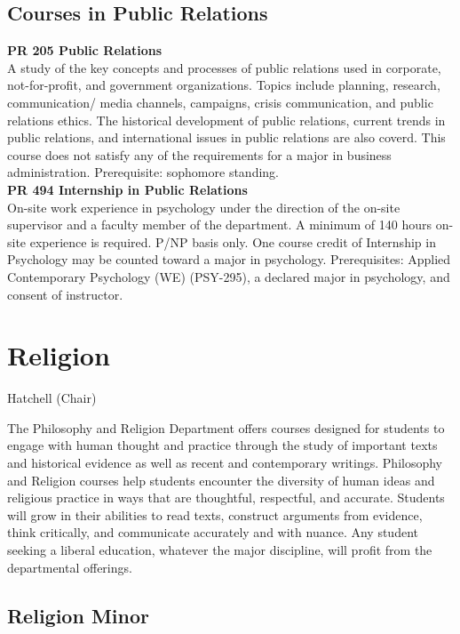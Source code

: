 \documentclass[
  letterpaper,
]{scrbook}
\begin{document}
\subsection{Courses in Public
Relations}\label{courses-in-public-relations}

\textbf{PR 205 Public Relations}\\
A study of the key concepts and processes of public relations used in
corporate, not-for-profit, and government organizations. Topics include
planning, research, communication/ media channels, campaigns, crisis
communication, and public relations ethics. The historical development
of public relations, current trends in public relations, and
international issues in public relations are also coverd. This course
does not satisfy any of the requirements for a major in business
administration. Prerequisite: sophomore standing.\\
\textbf{PR 494 Internship in Public Relations}\\
On-site work experience in psychology under the direction of the on-site
supervisor and a faculty member of the department. A minimum of 140
hours on-site experience is required. P/NP basis only. One course credit
of Internship in Psychology may be counted toward a major in psychology.
Prerequisites: Applied Contemporary Psychology (WE) (PSY-295), a
declared major in psychology, and consent of instructor.

\section{Religion}\label{sec-religion}

Hatchell (Chair)

The Philosophy and Religion Department offers courses designed for
students to engage with human thought and practice through the study of
important texts and historical evidence as well as recent and
contemporary writings. Philosophy and Religion courses help students
encounter the diversity of human ideas and religious practice in ways
that are thoughtful, respectful, and accurate. Students will grow in
their abilities to read texts, construct arguments from evidence, think
critically, and communicate accurately and with nuance. Any student
seeking a liberal education, whatever the major discipline, will profit
from the departmental offerings.

\subsection{Religion Minor}\label{religion-minor}
\end{document}
